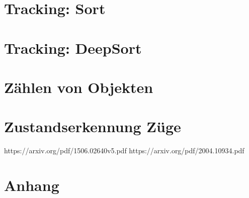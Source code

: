 \documentclass[conference]{IEEEtran}
\begin{document}
	\section{Tracking: Sort}
	
	\section{Tracking: DeepSort}
	
	\section{Zählen von Objekten}
	
	\section{Zustandserkennung Züge}
	
	\begin{thebibliography}{00}
		https://arxiv.org/pdf/1506.02640v5.pdf
		https://arxiv.org/pdf/2004.10934.pdf
	\end{thebibliography}
	
	
	
	\section{Anhang}
	
\end{document}
